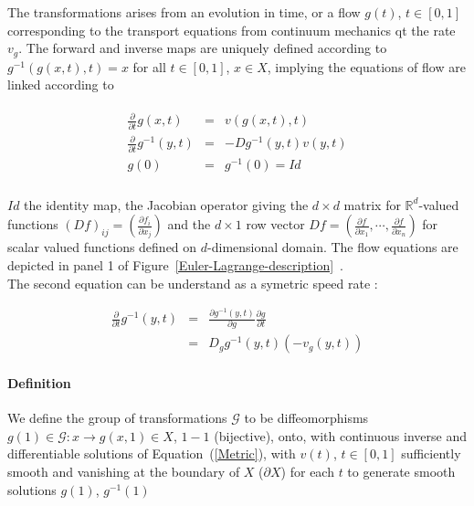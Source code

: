 \documentclass[preprint,review,8pt,times]{elsarticle}
\begin{document}
The transformations arises from an evolution in time, or a flow $g(t)$, $t \in [0, 1]$ corresponding to the transport equations from continuum mechanics qt the rate $v_{g}$. The forward and inverse maps are uniquely defined according to $g^{-1}(g(x, t), t) = x$ for all $t \in [0, 1]$, $x \in X$, implying the equations of flow are linked according to

\begin{eqnarray*}
\left .
\begin{array}{rcl}
\frac{\partial}{\partial t}g(x,t) &=& v(g(x,t),t) \\
\frac{\partial}{\partial t}g^{-1}(y,t) &=& -Dg^{-1}(y,t)v(y,t) \\
g(0) &=& g^{-1}(0) = Id \\
\end{array}
\right .
\label{Metric}
\end{eqnarray*}

$Id$ the identity map, the Jacobian operator giving the $d \times d$ matrix for $\mathbb{R}^{d}$-valued functions $(Df)_{ij} = (\frac{\partial f_{i}}{\partial x_{j}})$ and the $d \times 1$ row vector $Df = (\frac{\partial f}{\partial x_{1}}, \cdots, \frac{\partial f}{\partial x_{n}} )$ for scalar valued functions defined on $d$-dimensional domain. The flow equations are depicted in panel 1 of Figure~\ref{Euler-Lagrange-description}~\cite{pmid12117763}.\\
The second equation can be understand as a symetric speed rate :

\begin{eqnarray*}
\frac{\partial}{\partial t}g^{-1}(y,t) & = & \frac{\partial g^{-1}(y,t)}{\partial g}\frac{\partial g}{\partial t} \\
& = & D_{g} g^{-1}(y,t) (-v_{g}(y,t))
\end{eqnarray*}


\paragraph{Definition}{We define the group of transformations $\mathcal{G}$ to be diffeomorphisms $g(1) \in \mathcal{G}: x \rightarrow g(x, 1) \in X$, $1-1$ (bijective), onto, with continuous inverse and differentiable solutions of Equation~(\ref{Metric}), with $v(t)$, $t \in [0, 1]$ sufficiently smooth and vanishing at the boundary of $X$ ($\partial X$) for each $t$ to generate smooth solutions $g(1)$, $g^{-1}(1)$}

\end{document}

